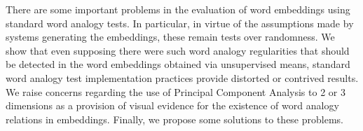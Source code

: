 There are some important problems in the evaluation of word embeddings using standard word analogy tests.  In particular, in virtue of the assumptions made by systems generating the embeddings, these remain tests over randomness.  We show that even supposing there were such word analogy regularities that should be detected in the word embeddings obtained via unsupervised means, standard word analogy test implementation practices provide distorted or contrived results.  We raise concerns regarding the use of Principal Component Analysis to 2 or 3 dimensions as a provision of visual evidence for the existence of word analogy relations in embeddings.  Finally, we propose some solutions to these problems.
